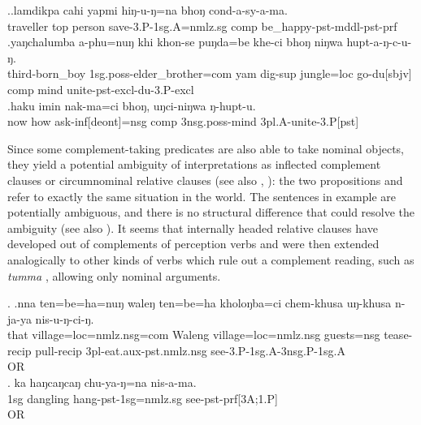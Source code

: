  
\ex.\ag.lamdikpa  cahi yapmi  hiŋ-u-ŋ=na       bhoŋ cond-a-sy-a-ma.\\
traveller {\sc top} person save{\sc [pst]-3.P-1sg.A=nmlz.sg} {\sc comp} be\_happy{\sc [3sg]-pst-mddl-pst-prf}\\
 
\bg.yaŋchalumba   a-phu=nuŋ  khi khon-se         puŋda=be    khe-ci   bhoŋ niŋwa hupt-a-ŋ-c-u-ŋ.\\
third-born\_boy {\sc 1sg.poss-}elder\_brother{\sc =com} yam dig{\sc -sup} jungle{\sc =loc} go{\sc -du[sbjv]} {\sc comp} mind unite{\sc -pst-excl-du-3.P-excl}\\
\bg.haku imin nak-ma=ci                  bhoŋ, uŋci-niŋwa       ŋ-hupt-u.\\
now how ask{\sc -inf[deont]=nsg} {\sc comp} {\sc 3nsg.poss-}mind {\sc 3pl.A-}unite{\sc -3.P[pst]}\\
 


Since some complement-taking predicates are also able to take nominal objects,  they yield a potential ambiguity of interpretations as inflected  complement clauses or circumnominal relative clauses (see also \citet[272]{Bickel1999Nominalization}, \citealt[120, 143]{Noonan2007Complementation}): the two propositions  and  refer to exactly the same situation in the world. The sentences in example \Next are potentially ambiguous, and there is no structural difference that could resolve the ambiguity (see also ). It seems that internally headed relative clauses have developed out of complements of perception verbs and were then extended analogically to other kinds of verbs which rule out a complement reading, such as \emph{tumma} , allowing only nominal arguments.

\ex. \ag.nna  ten=be=ha=nuŋ waleŋ  ten=be=ha kholoŋba=ci chem-khusa  uŋ-khusa    n-ja-ya    nis-u-ŋ-ci-ŋ.\\
that village{\sc =loc=nmlz.nsg=com} Waleng village{\sc =loc=nmlz.nsg} guests{\sc =nsg} tease{\sc -recip} pull{\sc -recip} {\sc 3pl-eat.aux-pst.nmlz.nsg} see{\sc [pst]-3.P-1sg.A-3nsg.P-1sg.A}\\
 OR\\
 
\bg.  ka  haŋcaŋcaŋ chu-ya-ŋ=na                  nis-a-ma.\\
{\sc 1sg} dangling hang{\sc -pst-1sg=nmlz.sg} see{\sc -pst-prf[3A;1.P]}\\
 OR \\
 


